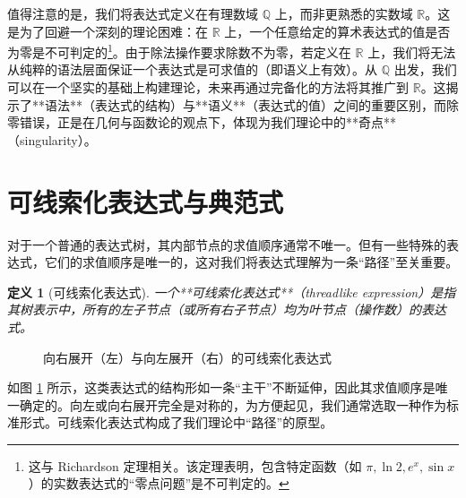 \documentclass[a4paper,12pt]{book}
\numberwithin{problem}{section}
\newtheorem{definition}{定义}
\numberwithin{definition}{section}
\numberwithin{lemma}{section}
\numberwithin{proposition}{section}
\numberwithin{theorem}{section}
\numberwithin{grammar}{section}
\numberwithin{program}{section}
\numberwithin{convention}{section}
\numberwithin{corollary}{section}
\begin{document}
值得注意的是，我们将表达式定义在有理数域 $\mathbb{Q}$ 上，而非更熟悉的实数域 $\mathbb{R}$。这是为了回避一个深刻的理论困难：在 $\mathbb{R}$ 上，一个任意给定的算术表达式的值是否为零是不可判定的\footnote{这与 Richardson 定理相关。该定理表明，包含特定函数（如 $\pi, \ln 2, e^x, \sin x$）的实数表达式的“零点问题”是不可判定的。}。由于除法操作要求除数不为零，若定义在 $\mathbb{R}$ 上，我们将无法从纯粹的语法层面保证一个表达式是可求值的（即语义上有效）。从 $\mathbb{Q}$ 出发，我们可以在一个坚实的基础上构建理论，未来再通过完备化的方法将其推广到 $\mathbb{R}$。这揭示了**语法**（表达式的结构）与**语义**（表达式的值）之间的重要区别，而除零错误，正是在几何与函数论的观点下，体现为我们理论中的**奇点**（singularity）。

\section{可线索化表达式与典范式}
\label{sec:threadlike_expressions}

对于一个普通的表达式树，其内部节点的求值顺序通常不唯一。但有一些特殊的表达式，它们的求值顺序是唯一的，这对我们将表达式理解为一条“路径”至关重要。

\begin{definition}[可线索化表达式]
    \label{def:threadlike_expression}
    一个**可线索化表达式**（threadlike expression）是指其树表示中，所有的左子节点（或所有右子节点）均为叶节点（操作数）的表达式。
\end{definition}

\begin{figure}[ht]
    \centering
    \caption{向右展开（左）与向左展开（右）的可线索化表达式}
    \label{fig:threadlike_trees}
\end{figure}

如图 \ref{fig:threadlike_trees} 所示，这类表达式的结构形如一条“主干”不断延伸，因此其求值顺序是唯一确定的。向左或向右展开完全是对称的，为方便起见，我们通常选取一种作为标准形式。可线索化表达式构成了我们理论中“路径”的原型。
\end{document}
